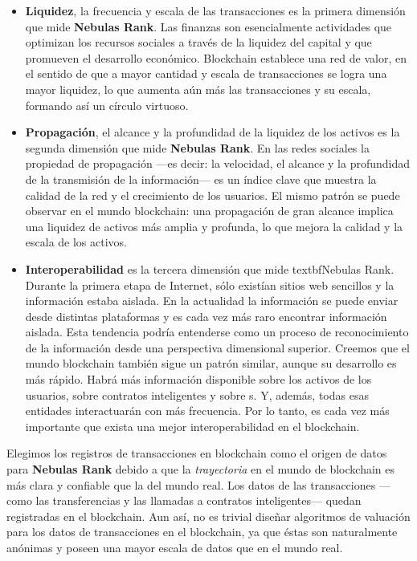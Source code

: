 \begin{itemize}

	\item \textbf{Liquidez}, la frecuencia y escala de las transacciones es la primera dimensión que mide \textbf{Nebulas Rank}. Las finanzas son esencialmente actividades que optimizan los recursos sociales a través de la liquidez del capital y que promueven el desarrollo económico. Blockchain establece una red de valor, en el sentido de que a mayor cantidad y escala de transacciones se logra una mayor liquidez, lo que aumenta aún más las transacciones y su escala, formando así un círculo virtuoso.

	\item \textbf{Propagación}, el alcance y la profundidad de la liquidez de los activos es la segunda dimensión que mide \textbf{Nebulas Rank}. En las redes sociales la propiedad de propagación —es decir: la velocidad, el alcance y la profundidad de la transmisión de la información— es un índice clave que muestra la calidad de la red y el crecimiento de los usuarios. El mismo patrón se puede observar en el mundo blockchain: una propagación de gran alcance implica una liquidez de activos más amplia y profunda, lo que mejora la calidad y la escala de los activos.

	\item \textbf{Interoperabilidad} es la tercera dimensión que mide textbf{Nebulas Rank}. Durante la primera etapa de Internet, sólo existían sitios web sencillos y la información estaba aislada. En la actualidad la información se puede enviar desde distintas plataformas y es cada vez más raro encontrar información aislada. Esta tendencia podría entenderse como un proceso de reconocimiento de la información desde una perspectiva dimensional superior. Creemos que el mundo blockchain también sigue un patrón similar, aunque su desarrollo es más rápido. Habrá más información disponible sobre los activos de los usuarios, sobre contratos inteligentes y sobre {\dapp}s. Y, además, todas esas entidades interactuarán con más frecuencia. Por lo tanto, es cada vez más importante que exista una mejor interoperabilidad en el blockchain.

\end{itemize}

Elegimos los registros de transacciones en blockchain como el origen de datos para \textbf{Nebulas Rank} debido a que la \textit{trayectoria} en el mundo de blockchain es más clara y confiable que la del mundo real. Los datos de las transacciones —como las transferencias y las llamadas a contratos inteligentes— quedan registradas en el blockchain. Aun así, no es trivial diseñar algoritmos de valuación para los datos de transacciones en el blockchain, ya que éstas son naturalmente anónimas y poseen una mayor escala de datos que en el mundo real.

